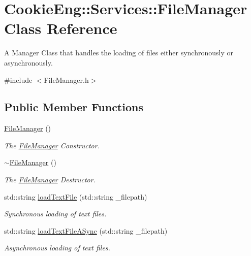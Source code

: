 \hypertarget{class_cookie_eng_1_1_services_1_1_file_manager}{}\section{Cookie\+Eng\+:\+:Services\+:\+:File\+Manager Class Reference}
\label{class_cookie_eng_1_1_services_1_1_file_manager}


A Manager Class that handles the loading of files either synchronously or asynchronously.  




{\ttfamily \#include $<$File\+Manager.\+h$>$}

\subsection*{Public Member Functions}
\begin{DoxyCompactItemize}
\item 
\hyperlink{class_cookie_eng_1_1_services_1_1_file_manager_a3ff15b868df81ba7d9964382f6474ef5}{File\+Manager} ()
\begin{DoxyCompactList}\small\item\em The \hyperlink{class_cookie_eng_1_1_services_1_1_file_manager}{File\+Manager} Constructor. \end{DoxyCompactList}\item 
\hyperlink{class_cookie_eng_1_1_services_1_1_file_manager_a51e133f4fd86a874129a63be191b91ba}{$\sim$\+File\+Manager} ()
\begin{DoxyCompactList}\small\item\em The \hyperlink{class_cookie_eng_1_1_services_1_1_file_manager}{File\+Manager} Destructor. \end{DoxyCompactList}\item 
std\+::string \hyperlink{class_cookie_eng_1_1_services_1_1_file_manager_a744bde422e66fcfbfcc379a21ae90500}{load\+Text\+File} (std\+::string \+\_\+filepath)
\begin{DoxyCompactList}\small\item\em Synchronous loading of text files. \end{DoxyCompactList}\item 
std\+::string \hyperlink{class_cookie_eng_1_1_services_1_1_file_manager_abf50a7b6eb9fa88a9557254acbd2d9cc}{load\+Text\+File\+A\+Sync} (std\+::string \+\_\+filepath)
\begin{DoxyCompactList}\small\item\em Asynchronous loading of text files. \end{DoxyCompactList}\end{DoxyCompactItemize}


